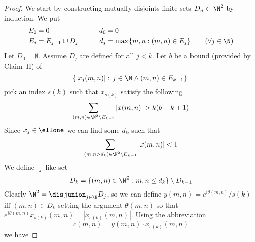 \begin{proof}
We start by constructing mutually disjoints finite
sets \(D_n \subset \N^2\) by induction.
We put
\begin{alignat*}{2}
E_0 &= 0    &  d_0 &= 0 \\
E_j &= E_{j-1} \cup D_j   \qquad &   d_j &= \max\{m, n: (m,n)\in E_j\}
   \qquad (\forall j\in\N)
\end{alignat*}
Let \(D_0 = \emptyset\).
Assume \(D_j\) are defined for all \(j < k\).
Let $b$ be a bound (provided by Claim~II) of
\begin{equation*}
\{|x_j(m,n)|: \, j\in\N \land (m,n) \in E_{k-1}\}.
\end{equation*}
pick an index \(s(k)\) such that \(x_{s(k)}\) satisfy the following
\begin{align*} 
\sum_{(m,n) \in \N^2 \setminus E_{k-1}} |x(m,n)| > k(b + k + 1)
\end{align*}
Since \(x_j\in \ellone\) we can find some \(d_k\) such that 
\begin{align*} 
\sum_{(m,n > d_k) \in \N^2 \setminus E_{k-1}} |x(m,n)| < 1
\end{align*}
We define \(\lrcorner\)-like set
\begin{equation*}
D_k = \{(m,n)\in \N^2: m,n \leq d_k\} \setminus D_{k-1}
\end{equation*}
Clearly \(\N^2 = \disjunion_{j\in\N} D_j\), so we can define
\(y(m,n) = e^{i\theta(m,n)}/s(k)\) iff \((m,n)\in D_k\)
setting the argument \(\theta(m,n)\)
so that \(e^{i\theta(m,n)} x_{s(k)}(m,n) = |x_{s(k)}(m,n)|\).
Using the abbreviation 
\begin{equation*}
c(m,n) =  y(m,n)\cdot x_{s(k)}(m,n)
\end{equation*}
 we have 
\end{proof}


